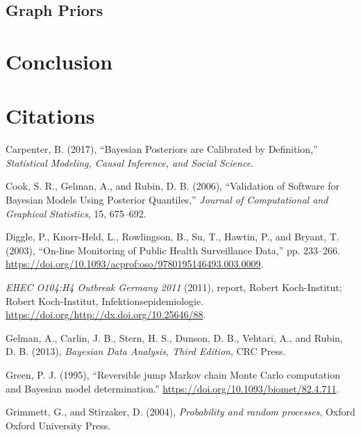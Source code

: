 \documentclass[11pt,a4paper]{article}
\numberwithin{equation}{section}
\begin{document}
\hypertarget{graph-priors}{%
\subsection{Graph Priors}\label{graph-priors}}

\hypertarget{conclusion}{%
\section{Conclusion}\label{conclusion}}

\hypertarget{citations}{%
\section*{Citations}\label{citations}}

\hypertarget{refs}{}
\leavevmode\hypertarget{ref-carpenter_bayesian_2017}{}%
Carpenter, B. (2017), ``Bayesian Posteriors are Calibrated by
Definition,'' \emph{Statistical Modeling, Causal Inference, and Social
Science}.

\leavevmode\hypertarget{ref-cook_validation_2006}{}%
Cook, S. R., Gelman, A., and Rubin, D. B. (2006), ``Validation of
Software for Bayesian Models Using Posterior Quantiles,'' \emph{Journal
of Computational and Graphical Statistics}, 15, 675--692.

\leavevmode\hypertarget{ref-diggle_-line_2003}{}%
Diggle, P., Knorr-Held, L., Rowlingson, B., Su, T., Hawtin, P., and
Bryant, T. (2003), ``On-line Monitoring of Public Health Surveillance
Data,'' pp. 233--266.
\url{https://doi.org/10.1093/acprof:oso/9780195146493.003.0009}.

\leavevmode\hypertarget{ref-noauthor_ehec_2011}{}%
\emph{EHEC O104:H4 Outbreak Germany 2011} (2011), report, Robert
Koch-Institut; Robert Koch-Institut, Infektionsepidemiologie.
\url{https://doi.org/http://dx.doi.org/10.25646/88}.

\leavevmode\hypertarget{ref-gelman_bayesian_2013}{}%
Gelman, A., Carlin, J. B., Stern, H. S., Dunson, D. B., Vehtari, A., and
Rubin, D. B. (2013), \emph{Bayesian Data Analysis, Third Edition}, CRC
Press.

\leavevmode\hypertarget{ref-green_reversible_1995}{}%
Green, P. J. (1995), ``Reversible jump Markov chain Monte Carlo
computation and Bayesian model determination.''
\url{https://doi.org/10.1093/biomet/82.4.711}.

\leavevmode\hypertarget{ref-grimmett_probability_2004}{}%
Grimmett, G., and Stirzaker, D. (2004), \emph{Probability and random
processes}, Oxford Oxford University Press.
\end{document}
